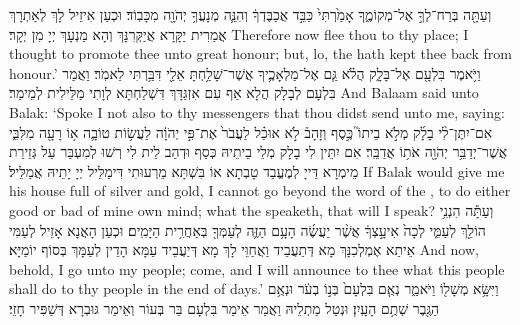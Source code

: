 {וְעַתָּ֖ה בְּרַח־לְךָ֣ אֶל־מְקוֹמֶ֑ךָ אָמַ֙רְתִּי֙ כַּבֵּ֣ד אֲכַבֶּדְךָ֔ וְהִנֵּ֛ה מְנָעֲךָ֥ יְהֹוָ֖ה מִכָּבֽוֹד׃}
{וּכְעַן אִיזֵיל לָךְ לְאַתְרָךְ אֲמַרִית יַקָּרָא אֲיַקְּרִנָּךְ וְהָא מַנְעָךְ יְיָ מִן יְקָר׃}
{Therefore now flee thou to thy place; I thought to promote thee unto great honour; but, lo, the \lord\space hath kept thee back from honour.’}{}
{וַיֹּ֥אמֶר בִּלְעָ֖ם אֶל־בָּלָ֑ק הֲלֹ֗א גַּ֧ם אֶל־מַלְאָכֶ֛יךָ אֲשֶׁר־שָׁלַ֥חְתָּ אֵלַ֖י דִּבַּ֥רְתִּי לֵאמֹֽר׃}
{וַאֲמַר בִּלְעָם לְבָלָק הֲלָא אַף עִם אִזְגַּדָּךְ דִּשְׁלַחְתָּא לְוָתִי מַלֵּילִית לְמֵימַר׃}
{And Balaam said unto Balak: ‘Spoke I not also to thy messengers that thou didst send unto me, saying:}{}
{אִם־יִתֶּן־לִ֨י בָלָ֜ק מְלֹ֣א בֵיתוֹ֮ כֶּ֣סֶף וְזָהָב֒ לֹ֣א אוּכַ֗ל לַעֲבֹר֙ אֶת־פִּ֣י יְהֹוָ֔ה לַעֲשׂ֥וֹת טוֹבָ֛ה א֥וֹ רָעָ֖ה מִלִּבִּ֑י אֲשֶׁר־יְדַבֵּ֥ר יְהֹוָ֖ה אֹת֥וֹ אֲדַבֵּֽר׃
}
{אִם יִתֵּין לִי בָלָק מְלֵי בֵיתֵיהּ כְּסַף וּדְהַב לֵית לִי רְשׁוּ לְמִעְבַּר עַל גְּזֵירַת מֵימְרָא דַּייָ לְמֶעֱבַד טָבְתָא אוֹ בִּשְׁתָּא מֵרְעוּתִי דִּימַלֵּיל יְיָ יָתֵיהּ אֲמַלֵּיל׃}
{If Balak would give me his house full of silver and gold, I cannot go beyond the word of the \lord, to do either good or bad of mine own mind; what the \lord\space speaketh, that will I speak?}{}
{וְעַתָּ֕ה הִנְנִ֥י הוֹלֵ֖ךְ לְעַמִּ֑י לְכָה֙ אִיעָ֣צְךָ֔ אֲשֶׁ֨ר יַעֲשֶׂ֜ה הָעָ֥ם הַזֶּ֛ה לְעַמְּךָ֖ בְּאַחֲרִ֥ית הַיָּמִֽים׃
}
{וּכְעַן הָאֲנָא אָזֵיל לְעַמִּי אֵיתַא אֶמְלְכִנָּךְ מָא דְּתַעֲבֵיד וַאֲחַוֵּי לָךְ מָא דְּיַעֲבֵיד עַמָּא הָדֵין לְעַמָּךְ בְּסוֹף יוֹמַיָּא׃}
{And now, behold, I go unto my people; come, and I will announce to thee what this people shall do to thy people in the end of days.’}{}
{וַיִּשָּׂ֥א מְשָׁל֖וֹ וַיֹּאמַ֑ר נְאֻ֤ם בִּלְעָם֙ בְּנ֣וֹ בְעֹ֔ר וּנְאֻ֥ם הַגֶּ֖בֶר שְׁתֻ֥ם הָעָֽיִן׃}
{וּנְטַל מַתְלֵיהּ וַאֲמַר אֵימַר בִּלְעָם בַּר בְּעוֹר וְאֵימַר גּוּבְרָא דְּשַׁפִּיר חָזֵי׃}

